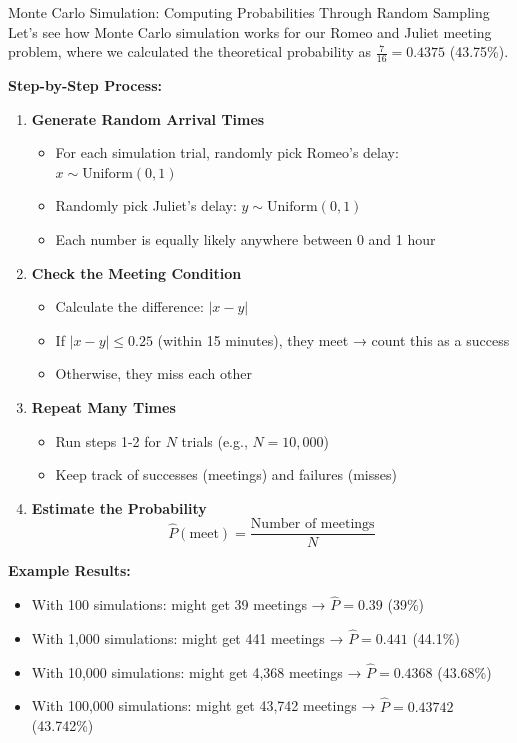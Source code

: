 \begin{itemize}
\begin{keyconceptboxbreak}{Monte Carlo Simulation: Computing Probabilities Through Random Sampling}
Let's see how Monte Carlo simulation works for our Romeo and Juliet meeting problem, where we calculated the theoretical probability as $\frac{7}{16} = 0.4375$ (43.75\%).

\textbf{Step-by-Step Process:}

\begin{enumerate}
    \item \textbf{Generate Random Arrival Times}
    \begin{itemize}
        \item For each simulation trial, randomly pick Romeo's delay: $x \sim \text{Uniform}(0, 1)$
        \item Randomly pick Juliet's delay: $y \sim \text{Uniform}(0, 1)$
        \item Each number is equally likely anywhere between 0 and 1 hour
    \end{itemize}

    \item \textbf{Check the Meeting Condition}
    \begin{itemize}
        \item Calculate the difference: $|x - y|$
        \item If $|x - y| \leq 0.25$ (within 15 minutes), they meet → count this as a success
        \item Otherwise, they miss each other
    \end{itemize}

    \item \textbf{Repeat Many Times}
    \begin{itemize}
        \item Run steps 1-2 for $N$ trials (e.g., $N = 10{,}000$)
        \item Keep track of successes (meetings) and failures (misses)
    \end{itemize}

    \item \textbf{Estimate the Probability}
    \[
    \hat{P}(\text{meet}) = \frac{\text{Number of meetings}}{N}
    \]
\end{enumerate}

\textbf{Example Results:}
\begin{itemize}
    \item With 100 simulations: might get 39 meetings → $\hat{P} = 0.39$ (39\%)
    \item With 1,000 simulations: might get 441 meetings → $\hat{P} = 0.441$ (44.1\%)
    \item With 10,000 simulations: might get 4,368 meetings → $\hat{P} = 0.4368$ (43.68\%)
    \item With 100,000 simulations: might get 43,742 meetings → $\hat{P} = 0.43742$ (43.742\%)
\end{itemize}


\end{keyconceptboxbreak}
\end{itemize}
